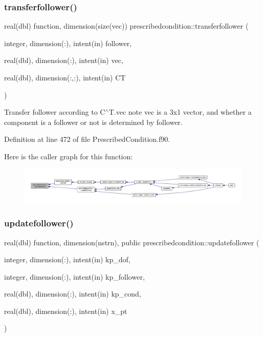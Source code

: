 \subsubsection{\texorpdfstring{transferfollower()}{transferfollower()}}
{\footnotesize\ttfamily real(dbl) function, dimension(size(vec)) prescribedcondition\+::transferfollower (\begin{DoxyParamCaption}\item[{integer, dimension(\+:), intent(in)}]{follower,  }\item[{real(dbl), dimension(\+:), intent(in)}]{vec,  }\item[{real(dbl), dimension(\+:,\+:), intent(in)}]{CT }\end{DoxyParamCaption})\hspace{0.3cm}{\ttfamily [private]}}



Transfer follower according to C$^\wedge$T.vec note vec is a 3x1 vector, and whether a component is a follower or not is determined by follower. 



Definition at line 472 of file Prescribed\+Condition.\+f90.

Here is the caller graph for this function\+:\nopagebreak
\begin{figure}[H]
\begin{center}
\leavevmode
\includegraphics[width=350pt]{namespaceprescribedcondition_aa60c7ca2dee406dc7cda895535b36927_icgraph}
\end{center}
\end{figure}
\mbox{\label{namespaceprescribedcondition_a58a4332d8bb0ceb882aa3229085dce34}} 
\subsubsection{\texorpdfstring{updatefollower()}{updatefollower()}}
{\footnotesize\ttfamily real(dbl) function, dimension(nstrn), public prescribedcondition\+::updatefollower (\begin{DoxyParamCaption}\item[{integer, dimension(\+:), intent(in)}]{kp\+\_\+dof,  }\item[{integer, dimension(\+:), intent(in)}]{kp\+\_\+follower,  }\item[{real(dbl), dimension(\+:), intent(in)}]{kp\+\_\+cond,  }\item[{real(dbl), dimension(\+:), intent(in)}]{x\+\_\+pt }\end{DoxyParamCaption})}



